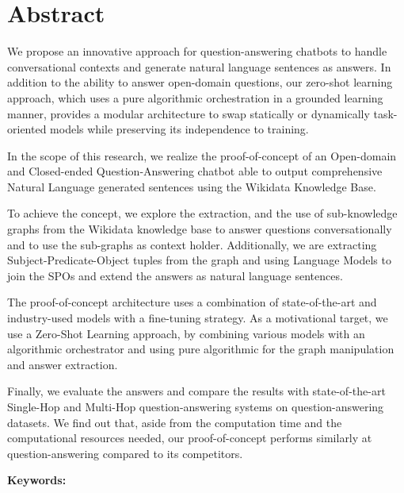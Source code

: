 \chapter*{Abstract}

We propose an innovative approach for question-answering chatbots to handle conversational contexts and generate natural language sentences as answers. In addition to the ability to answer open-domain questions, our zero-shot learning approach, which uses a pure algorithmic orchestration in a grounded learning manner, provides a modular architecture to swap statically or dynamically task-oriented models while preserving its independence to training.

In the scope of this research, we realize the proof-of-concept of an Open-domain and Closed-ended Question-Answering chatbot able to output comprehensive Natural Language generated sentences using the Wikidata Knowledge Base. 

To achieve the concept, we explore the extraction, and the use of sub-knowledge graphs from the Wikidata knowledge base to answer questions conversationally and to use the sub-graphs as context holder. Additionally, we are extracting Subject-Predicate-Object tuples from the graph and using Language Models to join the SPOs and extend the answers as natural language sentences.

The proof-of-concept architecture uses a combination of state-of-the-art and industry-used models with a fine-tuning strategy. As a motivational target, we use a Zero-Shot Learning approach, by combining various models with an algorithmic orchestrator and using pure algorithmic for the graph manipulation and answer extraction.

Finally, we evaluate the answers and compare the results with state-of-the-art Single-Hop and Multi-Hop question-answering systems on question-answering datasets. We find out that, aside from the computation time and the computational resources needed, our proof-of-concept performs similarly at question-answering compared to its competitors. 

\vskip0.5cm
\textbf{Keywords:} 
\Keywords